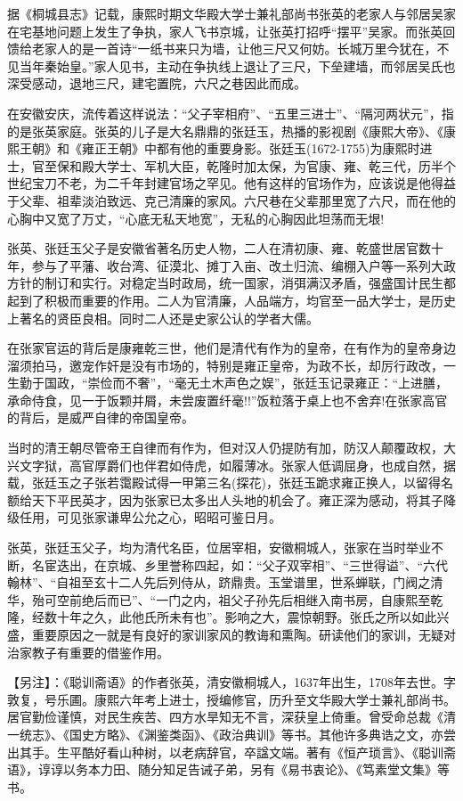 \documentclass[letterpaper,12pt,english]{sphinxmanual}
\begin{document}
据《桐城县志》记载，康熙时期文华殿大学士兼礼部尚书张英的老家人与邻居吴家在宅基地问题上发生了争执，家人飞书京城，让张英打招呼“摆平”吴家。而张英回馈给老家人的是一首诗“一纸书来只为墙，让他三尺又何妨。长城万里今犹在，不见当年秦始皇。”家人见书，主动在争执线上退让了三尺，下垒建墙，而邻居吴氏也深受感动，退地三尺，建宅置院，六尺之巷因此而成。

在安徽安庆，流传着这样说法：“父子宰相府”、“五里三进士”、“隔河两状元”，指的是张英家庭。张英的儿子是大名鼎鼎的张廷玉，热播的影视剧《康熙大帝》、《康熙王朝》和《雍正王朝》中都有他的重要身影。张廷玉(1672-1755)为康熙时进士，官至保和殿大学士、军机大臣，乾隆时加太保，为官康、雍、乾三代，历半个世纪宝刀不老，为二千年封建官场之罕见。他有这样的官场作为，应该说是他得益于父辈、祖辈淡泊致远、克己清廉的家风。六尺巷在父辈那里宽了六尺，而在他的心胸中又宽了万丈，“心底无私天地宽”，无私的心胸因此坦荡而无垠!

张英、张廷玉父子是安徽省著名历史人物，二人在清初康、雍、乾盛世居官数十年，参与了平藩、收台湾、征漠北、摊丁入亩、改土归流、编棚入户等一系列大政方针的制订和实行。对稳定当时政局，统一国家，消弭满汉矛盾，强盛国计民生都起到了积极而重要的作用。二人为官清廉，人品端方，均官至一品大学士，是历史上著名的贤臣良相。同时二人还是史家公认的学者大儒。

在张家官运的背后是康雍乾三世，他们是清代有作为的皇帝，在有作为的皇帝身边溜须拍马，邀宠作奸是没有市场的，特别是雍正皇帝，为政不长，却厉行政改，一生勤于国政，“崇俭而不奢”，“毫无土木声色之娱”，张廷玉记录雍正：“上进膳，承命侍食，见一于饭颗并屑，未尝废置纤毫!!”饭粒落于桌上也不舍弃!在张家高官的背后，是威严自律的帝国皇帝。

当时的清王朝尽管帝王自律而有作为，但对汉人仍提防有加，防汉人颠覆政权，大兴文字狱，高官厚爵们也伴君如侍虎，如履薄冰。张家人低调屈身，也成自然，据载，张廷玉之子张若霭殿试得一甲第三名(探花)，张廷玉跪求雍正换人，以留得名额给天下平民英才，因为张家已太多出人头地的机会了。雍正深为感动，将其子降级任用，可见张家谦卑公允之心，昭昭可鉴日月。

张英，张廷玉父子，均为清代名臣，位居宰相，安徽桐城人，张家在当时举业不断，名宦迭出，在京城、乡里誉称四起，如：“父子双宰相”、“三世得谥”、“六代翰林”、“自祖至玄十二人先后列侍从，跻鼎贵。玉堂谱里，世系蝉联，门阀之清华，殆可空前绝后而已”、“一门之内，祖父子孙先后相继入南书房，自康熙至乾隆，经数十年之久，此他氏所未有也”。影响之大，震惊朝野。张氏之所以如此兴盛，重要原因之一就是有良好的家训家风的教诲和熏陶。研读他们的家训，无疑对治家教子有重要的借鉴作用。

【另注】：《聪训斋语》的作者张英，清安徽桐城人，1637年出生，1708年去世。字敦复，号乐圃。康熙六年考上进士，授编修官，历升至文华殿大学士兼礼部尚书。居官勤俭谨慎，对民生疾苦、四方水旱知无不言，深获皇上倚重。曾受命总裁《清一统志》、《国史方略》、《渊鉴类函》、《政治典训》等书。其他许多典诰之文，亦尝出其手。生平酷好看山种树，以老病辞官，卒諡文端。著有《恒产琐言》、《聪训斋语》，谆谆以务本力田、随分知足告诫子弟，另有《易书衷论》、《笃素堂文集》等书。
\end{document}

